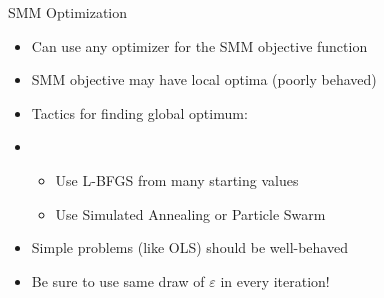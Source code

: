 \documentclass[aspectratio=169]{beamer}
\begin{document}
\begin{frame}

SMM Optimization

\bigskip

\begin{itemize}
\itemsep1.5em
\item<2-> Can use any optimizer for the SMM objective function
\item<3-> SMM objective may have local optima (poorly behaved)
\item<4-> Tactics for finding global optimum:
\item<4->[]
    \begin{itemize}
    \itemsep1.5em
    \item Use L-BFGS from many starting values
    \item Use Simulated Annealing or Particle Swarm
    \end{itemize}
\item<5-> Simple problems (like OLS) should be well-behaved
\item<6-> Be sure to use same draw of $\varepsilon$ in every iteration!
\end{itemize}

\end{frame}
\end{document}
